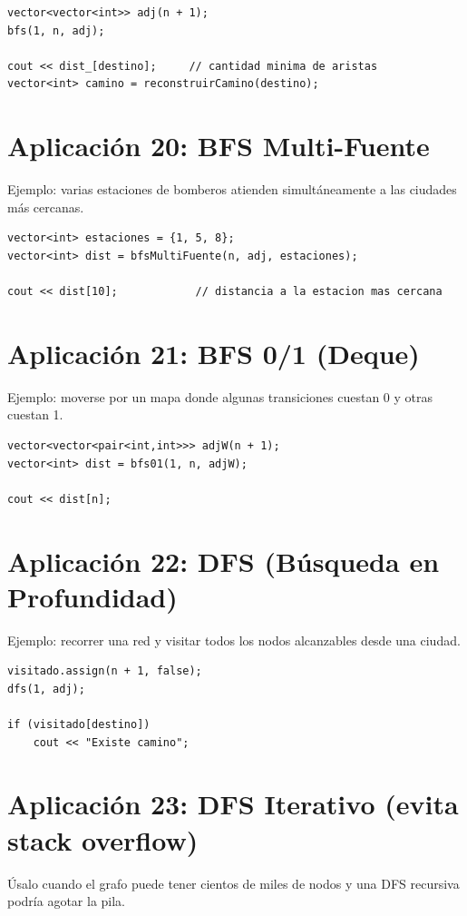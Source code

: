 \documentclass[10pt,twocolumn,letterpaper]{report}
\begin{document}
\begin{lstlisting}
vector<vector<int>> adj(n + 1);
bfs(1, n, adj);

cout << dist_[destino];     // cantidad minima de aristas
vector<int> camino = reconstruirCamino(destino);
\end{lstlisting}

\section{Aplicación 20: BFS Multi-Fuente}
Ejemplo: varias estaciones de bomberos atienden simultáneamente a las ciudades más cercanas.

\begin{lstlisting}
vector<int> estaciones = {1, 5, 8};
vector<int> dist = bfsMultiFuente(n, adj, estaciones);

cout << dist[10];            // distancia a la estacion mas cercana
\end{lstlisting}

\section{Aplicación 21: BFS 0/1 (Deque)}
Ejemplo: moverse por un mapa donde algunas transiciones cuestan 0 y otras cuestan 1.

\begin{lstlisting}
vector<vector<pair<int,int>>> adjW(n + 1);
vector<int> dist = bfs01(1, n, adjW);

cout << dist[n];
\end{lstlisting}

\section{Aplicación 22: DFS (Búsqueda en Profundidad)}
Ejemplo: recorrer una red y visitar todos los nodos alcanzables desde una ciudad.

\begin{lstlisting}
visitado.assign(n + 1, false);
dfs(1, adj);

if (visitado[destino])
    cout << "Existe camino";
\end{lstlisting}

\section{Aplicación 23: DFS Iterativo (evita stack overflow)}
Úsalo cuando el grafo puede tener cientos de miles de nodos y una DFS recursiva podría agotar la pila.
\end{document}
